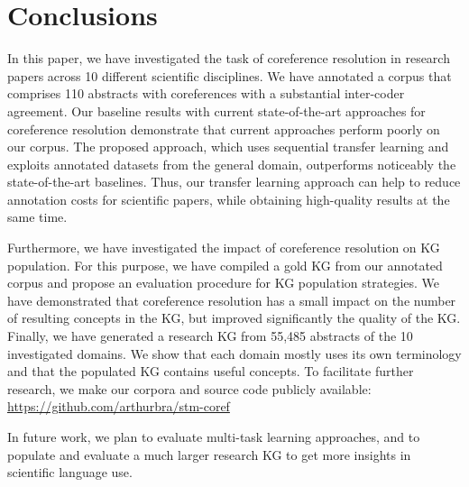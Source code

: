 \documentclass[runningheads]{llncs}
\begin{document}
\section{Conclusions}
In this paper, we have investigated the task of coreference resolution in research papers across 10 different scientific disciplines. We have annotated a corpus that comprises 110 abstracts with coreferences with a substantial inter-coder agreement. Our baseline results with current state-of-the-art approaches for coreference resolution demonstrate that current approaches perform poorly on our corpus. The proposed approach, which uses sequential transfer learning and exploits annotated datasets from the general domain, outperforms noticeably the state-of-the-art baselines. Thus, our transfer learning approach can help to reduce annotation costs for scientific papers, while obtaining high-quality results at the same time. 

Furthermore, we have investigated the impact of coreference resolution on KG population. For this purpose, we have compiled a gold KG from our annotated corpus and propose an evaluation procedure for KG population strategies. We have demonstrated that coreference resolution has a small impact on the number of resulting concepts in the KG, but improved significantly the quality of the KG.
Finally, we have generated a research KG from 55,485 abstracts of the 10 investigated domains. 
We show that each domain mostly uses its own terminology and that the populated KG contains useful concepts.
To facilitate further research, we make our corpora and source code publicly available: \url{https://github.com/arthurbra/stm-coref}

In future work, we plan to evaluate multi-task learning approaches, and to populate and evaluate a much larger research KG to get more insights in scientific language use.




\end{document}
